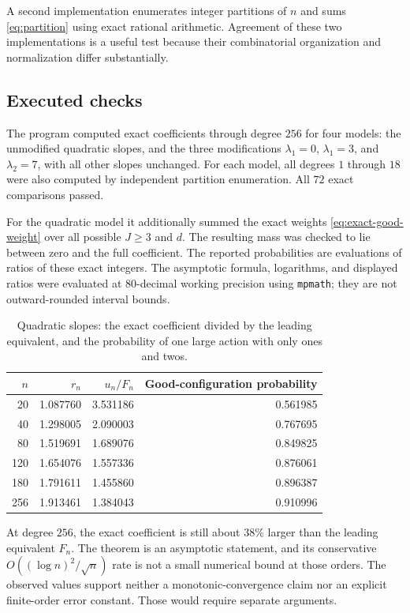 \documentclass[11pt,a4paper]{article}
\theoremstyle{definition}
\numberwithin{equation}{section}
\begin{document}
A second implementation enumerates integer partitions of \(n\) and sums
\eqref{eq:partition} using exact rational arithmetic. Agreement of these
two implementations is a useful test because their combinatorial
organization and normalization differ substantially.

\subsection{Executed checks}
The program computed exact coefficients through degree \(256\) for four
models: the unmodified quadratic slopes, and the three modifications
\(\lambda_1=0\), \(\lambda_1=3\), and \(\lambda_2=7\), with all other
slopes unchanged. For each model, all degrees \(1\) through \(18\) were
also computed by independent partition enumeration. All \(72\) exact
comparisons passed.

For the quadratic model it additionally summed the exact weights
\eqref{eq:exact-good-weight} over all possible \(J\ge3\) and \(d\).
The resulting mass was checked to lie between zero and the full
coefficient. The reported probabilities are evaluations of ratios of
these exact integers. The asymptotic formula, logarithms, and displayed
ratios were evaluated at \(80\)-decimal working precision using
\texttt{mpmath}; they are not outward-rounded interval bounds.

\begin{table}[htbp]
\centering
\caption{Quadratic slopes: the exact coefficient divided by the leading
 equivalent, and the probability of one large action with only ones and twos.}
\label{tab:diagnostics}
\begin{tabular}{@{}rrrr@{}}
\toprule
\(n\)&\(r_n\)&\(u_n/F_n\)&Good-configuration probability\\
\midrule
20  &1.087760&3.531186&0.561985\\
40  &1.298005&2.090003&0.767695\\
80  &1.519691&1.689076&0.849825\\
120 &1.654076&1.557336&0.876061\\
180 &1.791611&1.455860&0.896387\\
256 &1.913461&1.384043&0.910996\\
\bottomrule
\end{tabular}
\end{table}
At degree \(256\), the exact coefficient is still about \(38\%\) larger
than the leading equivalent \(F_n\). The theorem
is an asymptotic statement, and its conservative
\(O((\log n)^2/\sqrt n)\) rate is not a small numerical bound at those
orders. The observed values support neither a monotonic-convergence claim
nor an explicit finite-order error constant. Those would require separate
arguments.
\end{document}
